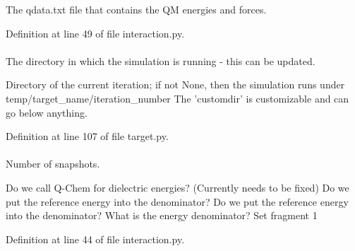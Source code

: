 \-The qdata.\-txt file that contains the \-Q\-M energies and forces. 



\-Definition at line 49 of file interaction.\-py.

\hypertarget{classforcebalance_1_1target_1_1Target_a1da470037ef61c22dc44beb85cfa01a9}{
\paragraph[{rundir}]{}}\label{classforcebalance_1_1target_1_1Target_a1da470037ef61c22dc44beb85cfa01a9}


\-The directory in which the simulation is running -\/ this can be updated. 

\-Directory of the current iteration; if not \-None, then the simulation runs under temp/target\-\_\-name/iteration\-\_\-number \-The 'customdir' is customizable and can go below anything.

\-Definition at line 107 of file target.\-py.

\hypertarget{classforcebalance_1_1interaction_1_1Interaction_ab39f595a8116711d03992a37776ec7e7}{
\paragraph[{select1}]{}}\label{classforcebalance_1_1interaction_1_1Interaction_ab39f595a8116711d03992a37776ec7e7}


\-Number of snapshots. 

\-Do we call \-Q-\/\-Chem for dielectric energies? (\-Currently needs to be fixed) \-Do we put the reference energy into the denominator? \-Do we put the reference energy into the denominator? \-What is the energy denominator? \-Set fragment 1 

\-Definition at line 44 of file interaction.\-py.

